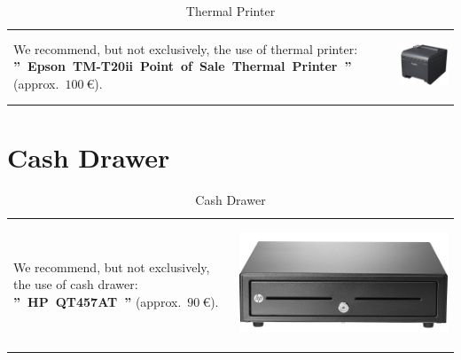 \documentclass[12pt, a4paper]{article}
\newcommand{\money}[1]{$#1\ \euro{}$\xspace}
\begin{document}
\begin{table}[!htbp]
\begin{tabular}{lr}
\parbox{25em}{
We recommend, but not exclusively,
the use of thermal printer: 
\textbf{''~Epson~TM-T20ii~Point~of~Sale~Thermal~Printer~''}
(approx.~\money{100}).
\vspace{-3em}
}

&

\parbox{17em}{
\begin{center}
\includegraphics[scale=0.27]{images/epson-tm-t20-pos-thermal-printer.png}
\caption*{Thermal Printer}
\end{center}
}
\end{tabular}
\end{table}

\vspace{0em}
\section{Cash Drawer}
\vspace{-3.1em}

\begin{table}[!htbp]
\begin{tabular}{lr}
\parbox{25em}{
We recommend, but not exclusively,
the use of cash drawer:
\textbf{''~HP~QT457AT~''} (approx.~\money{90}).
\vspace{-3em}
}

&

\parbox{17em}{
\begin{center}
\includegraphics[scale=0.07]{images/hp-cash-drawer.png}
\caption*{Cash Drawer}
\end{center}
}
\end{tabular}
\end{table}
\end{document}
